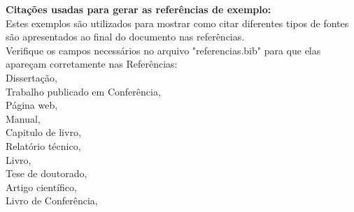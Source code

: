 \textbf{Citações usadas para gerar as referências de exemplo:}\\
Estes exemplos são utilizados para mostrar como citar diferentes tipos de fontes são apresentados ao final do documento nas referências.\\
Verifique os campos necessários no arquivo "referencias.bib" para que elas apareçam corretamente nas Referências:  \\
Dissertação, \cite{almeida2022}\\
Trabalho publicado em Conferência, \cite{cbsoft2023}\\
Página web, \cite{ferreira2020}\\
Manual, \cite{latex2023}\\
Capitulo de livro, \cite{mendes2019}\\
Relatório técnico, \cite{oliveira2020}\\
Livro, \cite{linden2012}\\
Tese de doutorado, \cite{rodrigues2021}\\
Artigo científico, \cite{silva2023}\\
Livro de Conferência, \cite{souza2022}